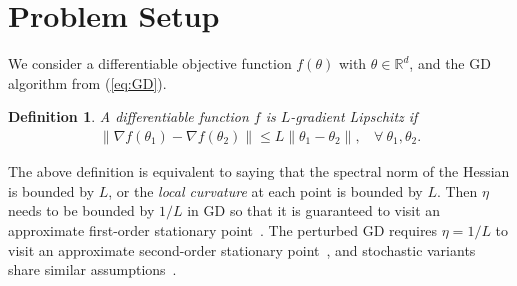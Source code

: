\documentclass{article}
\newcommand{\citet}[1]{\cite{#1}}
\newcommand{\citep}[1]{\cite{#1}}
\theoremstyle{plain}
\newtheorem{defi}{Definition}
\theoremstyle{remark}
\newcommand{\norm}[1]{\left\lVert#1\right\rVert}
\def\t{^{(t)}}
\def\tt{^{(t+1)}}
\def\R{\mathbb{R}}
\begin{document}


\section{Problem Setup}

We consider a differentiable objective function $f(\theta)$ with $\theta \in \mathbb{R}^d$, and the GD algorithm from (\ref{eq:GD}). 

\begin{defi}
A differentiable function $f$ is $L$-gradient Lipschitz if 
\begin{align}
    \norm{\nabla f(\theta_1)-\nabla f(\theta_2)}\le L\norm{\theta_1 - \theta_2}, ~~~~\forall~ \theta_1,\theta_2.
\end{align}
\end{defi}

The above definition is equivalent to saying that the spectral norm of the Hessian is bounded by $L$, or the \textit{local curvature} at each point is bounded by $L$.
Then $\eta$ needs to be bounded by $1/L$ in GD so that it is guaranteed to visit an approximate first-order stationary point~\citep{nesterov1998introductory}. The perturbed GD requires $\eta=1/L$ to visit an approximate second-order stationary point~\citep{jin2021nonconvex}, and stochastic variants share similar assumptions~\citep{ghadimi2013stochastic, jin2021nonconvex}.
\end{document}
